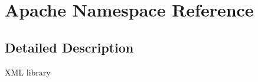 \hypertarget{namespace_apache}{\section{Apache Namespace Reference}
\label{namespace_apache}
}


\subsection{Detailed Description}
X\-M\-L library 